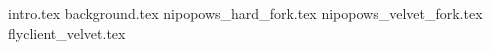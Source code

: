 {intro.tex}
{background.tex}
{nipopows_hard_fork.tex}
{nipopows_velvet_fork.tex}
{flyclient_velvet.tex}
